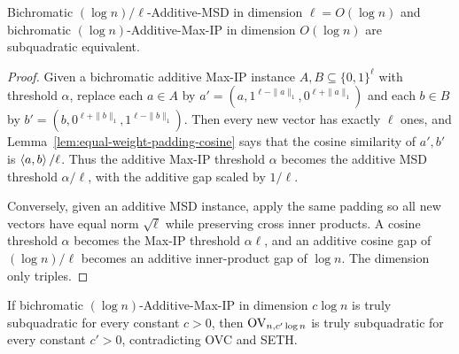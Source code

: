 \begin{lemma}
  \label{lem:additive-msd-maxip-equivalence}
  Bichromatic $(\log n)/\ell$-Additive-MSD in dimension $\ell=O(\log n)$ and
  bichromatic $(\log n)$-Additive-Max-IP in dimension $O(\log n)$ are
  subquadratic equivalent.
\end{lemma}
\begin{proof}
  Given a bichromatic additive Max-IP instance $A,B\subseteq\{0,1\}^{\ell}$ with
  threshold $\alpha$, replace each $a\in A$ by
  $a'=(a,1^{\ell-\|a\|_1},0^{\ell+\|a\|_1})$ and each $b\in B$ by
  $b'=(b,0^{\ell+\|b\|_1},1^{\ell-\|b\|_1})$.  Then every new vector has exactly
  $\ell$ ones, and Lemma~\ref{lem:equal-weight-padding-cosine} says that the
  cosine similarity of $a',b'$ is $\left\langle a,b\right\rangle/\ell$.  Thus the additive Max-IP
  threshold $\alpha$ becomes the additive MSD threshold $\alpha/\ell$, with the
  additive gap scaled by $1/\ell$.

  Conversely, given an additive MSD instance, apply the same padding so all new
  vectors have equal norm $\sqrt{\ell}$ while preserving cross inner products.
  A cosine threshold $\alpha$ becomes the Max-IP threshold $\alpha\ell$, and an
  additive cosine gap of $(\log n)/\ell$ becomes an additive inner-product gap
  of $\log n$.  The dimension only triples.
\end{proof}

\begin{theorem}
  \label{thm:chen-additive-maxip-hard}
  \notready
  If bichromatic $(\log n)$-Additive-Max-IP in dimension $c\log n$ is truly
  subquadratic for every constant $c>0$, then $\mathrm{OV}_{n,c'\log n}$ is truly
  subquadratic for every constant $c'>0$, contradicting OVC and SETH.
\end{theorem}

